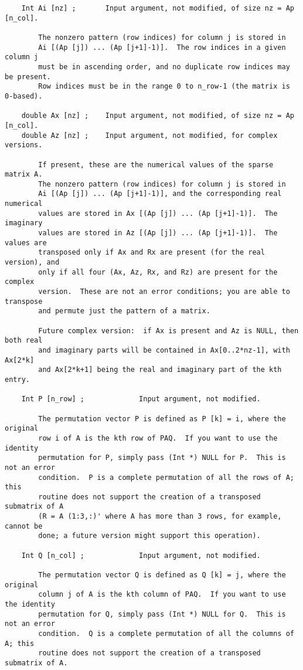 {\begin{verbatim}
    Int Ai [nz] ;       Input argument, not modified, of size nz = Ap [n_col].

        The nonzero pattern (row indices) for column j is stored in
        Ai [(Ap [j]) ... (Ap [j+1]-1)].  The row indices in a given column j
        must be in ascending order, and no duplicate row indices may be present.
        Row indices must be in the range 0 to n_row-1 (the matrix is 0-based).

    double Ax [nz] ;    Input argument, not modified, of size nz = Ap [n_col].
    double Az [nz] ;    Input argument, not modified, for complex versions.

        If present, these are the numerical values of the sparse matrix A.
        The nonzero pattern (row indices) for column j is stored in
        Ai [(Ap [j]) ... (Ap [j+1]-1)], and the corresponding real numerical
        values are stored in Ax [(Ap [j]) ... (Ap [j+1]-1)].  The imaginary
        values are stored in Az [(Ap [j]) ... (Ap [j+1]-1)].  The values are
        transposed only if Ax and Rx are present (for the real version), and
        only if all four (Ax, Az, Rx, and Rz) are present for the complex
        version.  These are not an error conditions; you are able to transpose
        and permute just the pattern of a matrix.

        Future complex version:  if Ax is present and Az is NULL, then both real
        and imaginary parts will be contained in Ax[0..2*nz-1], with Ax[2*k]
        and Ax[2*k+1] being the real and imaginary part of the kth entry.

    Int P [n_row] ;             Input argument, not modified.

        The permutation vector P is defined as P [k] = i, where the original
        row i of A is the kth row of PAQ.  If you want to use the identity
        permutation for P, simply pass (Int *) NULL for P.  This is not an error
        condition.  P is a complete permutation of all the rows of A; this
        routine does not support the creation of a transposed submatrix of A
        (R = A (1:3,:)' where A has more than 3 rows, for example, cannot be
        done; a future version might support this operation).

    Int Q [n_col] ;             Input argument, not modified.

        The permutation vector Q is defined as Q [k] = j, where the original
        column j of A is the kth column of PAQ.  If you want to use the identity
        permutation for Q, simply pass (Int *) NULL for Q.  This is not an error
        condition.  Q is a complete permutation of all the columns of A; this
        routine does not support the creation of a transposed submatrix of A.


\end{verbatim}}
